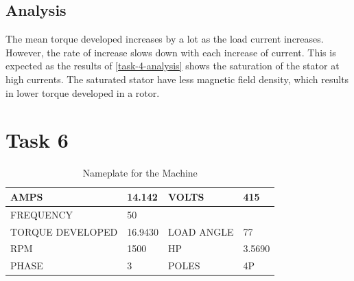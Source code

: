 \documentclass[12pt]{article}
\begin{document}
\subsection{Analysis}

The mean torque developed increases by a lot as the load current increases. However, the rate of increase slows down with each increase of current. This is expected as the results of \ref{task-4-analysis} shows the saturation of the stator at high currents. The saturated stator have less magnetic field density, which results in lower torque developed in a rotor.

\section{Task 6}

\begin{table}[H]
    \centering
    \begin{tabular}{|l l | l l|}
         \hline
         AMPS& 14.142& VOLTS& 415\\
         \hline
         FREQUENCY& 50& &\\
         \hline
         TORQUE DEVELOPED& 16.9430& LOAD ANGLE& 77\\
         \hline
         RPM& 1500& HP& 3.5690\\
         \hline
         PHASE& 3& POLES& 4P\\
         \hline
    \end{tabular}
    \caption{Nameplate for the Machine}
    \label{tab:nameplate}
\end{table}
\end{document}
